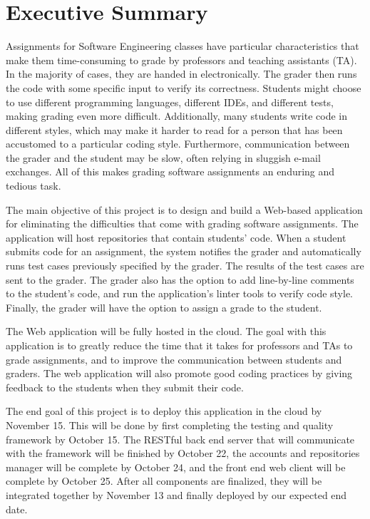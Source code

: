 \part*{Executive Summary}

Assignments for Software Engineering classes have particular characteristics
that make them time-consuming to grade by professors and teaching assistants
(TA). In the majority of cases, they are handed in electronically. The grader
then runs the code with some specific input to verify its correctness. Students
might choose to use different programming languages, different IDEs, and
different tests, making grading even more difficult. Additionally, many students
write code in different styles, which may make it harder to read for a person
that has been accustomed to a particular coding style. Furthermore,
communication between the grader and the student may be slow, often relying in
sluggish e-mail exchanges. All of this makes grading software assignments an
enduring and tedious task.

The main objective of this project is to design and build a Web-based
application  for eliminating the difficulties that come with grading software
assignments. The application will host repositories that contain students' code.
When a student submits code for an assignment, the system notifies the grader
and automatically runs test cases previously specified by the grader. The
results of the test cases are sent to the grader. The grader also has the option
to add line-by-line comments to the student's code, and run the application's
linter tools to verify code style. Finally, the grader will have the option to
assign a grade to the student.

The Web application will be fully hosted in the cloud. The goal with this
application is to greatly reduce the time that it takes for professors and TAs
to grade assignments, and to improve the communication between students and
graders. The web application will also promote good coding practices by giving
feedback to the students when they submit their code.

The end goal of this project is to deploy this application in the cloud by
November 15. This will be done by first completing the testing and quality
framework by October 15. The RESTful back end server that will communicate
with the framework will be finished by October 22, the accounts and repositories
manager will be complete by October 24, and the front end web client will be
complete by October 25. After all components are finalized, they will be
integrated together by November 13 and finally deployed by our expected end
date.

